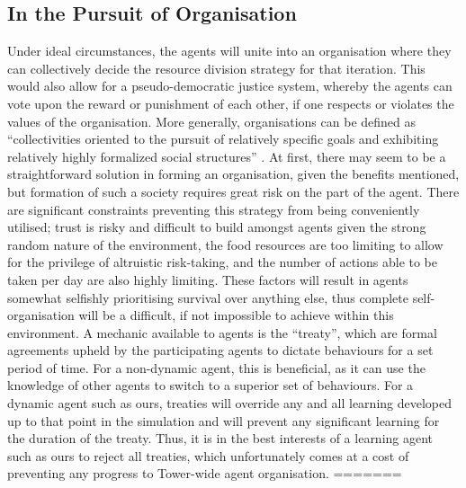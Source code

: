 \subsection{In the Pursuit of Organisation}\label{team2-organisation}
Under ideal circumstances, the agents will unite into an organisation where they can collectively decide the resource division strategy for that iteration. This would also allow for a pseudo-democratic justice system, whereby the agents can vote upon the reward or punishment of each other, if one respects or violates the values of the organisation. More generally, organisations can be defined as “collectivities oriented to the pursuit of relatively specific goals and exhibiting relatively highly formalized social structures” \cite{WhettenDavidA1983ORNa}. At first, there may seem to be a straightforward solution in forming an organisation, given the benefits mentioned, but formation of such a society requires great risk on the part of the agent. There are significant constraints preventing this strategy from being conveniently utilised; trust is risky and difficult to build amongst agents given the strong random nature of the environment, the food resources are too limiting to allow for the privilege of altruistic risk-taking, and the number of actions able to be taken per day are also highly limiting. These factors will result in agents somewhat selfishly prioritising survival over anything else, thus complete self-organisation will be a difficult, if not impossible to achieve within this environment. A mechanic available to agents is the “treaty”, which are formal agreements upheld by the participating agents to dictate behaviours for a set period of time. For a non-dynamic agent, this is beneficial, as it can use the knowledge of other agents to switch to a superior set of behaviours. For a dynamic agent such as ours, treaties will override any and all learning developed up to that point in the simulation and will prevent any significant learning for the duration of the treaty. Thus, it is in the best interests of a learning agent such as ours to reject all treaties, which unfortunately comes at a cost of preventing any progress to Tower-wide agent organisation. 
=======
